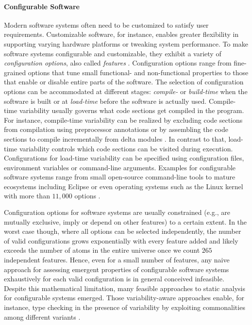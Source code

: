 \paragraph{Configurable Software}
Modern software systems often need to
be customized to satisfy user requirements. Customizable software, for instance,
enables greater flexibility in supporting varying hardware platforms or tweaking
system performance. To make software systems configurable and customizable, they
exhibit a variety of \emph{configuration options}, also called
\emph{features} \citep{apel_feature-oriented_2013}.
Configuration options range from fine-grained options that tune small
functional- and non-functional properties to those that enable or disable entire
parts of the software. The selection of configuration options can be
accommodated at different stages: \emph{compile-} or \emph{build-time} when the
software is built or at \emph{load-time} before the software is actually used.
Compile-time variability usually governs what code sections get
compiled in the program. For instance, compile-time variability can be
realized by excluding code sections from compilation using preprocessor
annotations \citep{hunsen_preprocessor-based_2016} or by assembling the code
sections to compile incrementally from delta modules
\citep{schaefer_delta-oriented_2010}. In contrast to that, load-time variability
controls which code sections can be visited during execution. Configurations for
load-time variability can be specified using configuration files, environment
variables or command-line arguments. Examples for configurable software systems
range from small open-source command-line tools to mature ecosystems including
Eclipse or even operating systems such as the Linux kernel with more than
$11,000$ options \citep{dietrich_robust_2012}.

Configuration options for
software systems are usually constrained (e.g., are mutually exclusive, imply
or depend on other features) to a certain extent. In the worst case though,
where all options can be selected independently, the number of valid
configurations grows exponentially with every feature added and likely exceeds
the number of atoms in the entire universe once we count $265$ independent
features. Hence, even for a small number of features, any naive approach for
assessing emergent properties of configurable software systems exhaustively for
each valid configuration is in general conceived infeasible. Despite this
mathematical limitation, many feasible approaches to static analysis for
configurable systems emerged. Those variability-aware approaches enable, for
instance, type checking in the presence of variability by exploiting
commonalities among different variants \citep{thum_classification_2014}.

